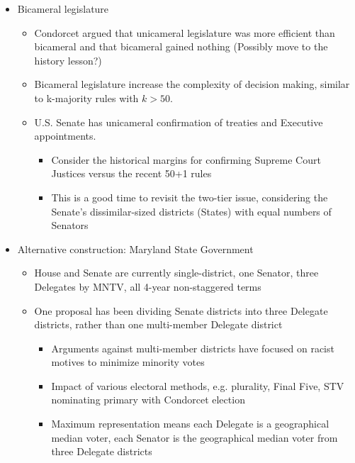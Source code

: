\begin{itemize}
    \item Bicameral legislature
    \begin{itemize}
        \item Condorcet argued that unicameral legislature was more efficient than bicameral and that bicameral gained nothing (Possibly move to the history lesson?)

        \item Bicameral legislature increase the complexity of decision making, similar to k-majority rules with $k>50$.

        \item U.S. Senate has unicameral confirmation of treaties and Executive appointments.
        \begin{itemize}
            \item Consider the historical margins for confirming Supreme Court Justices versus the recent 50+1 rules

            \item This is a good time to revisit the two-tier issue, considering the Senate's dissimilar-sized districts (States) with equal numbers of Senators
        \end{itemize}
    \end{itemize}

    \item Alternative construction:  Maryland State Government
    \begin{itemize}
        \item House and Senate are currently single-district, one Senator, three Delegates by MNTV, all 4-year non-staggered terms

        \item One proposal has been dividing Senate districts into three Delegate districts, rather than one multi-member Delegate district
        \begin{itemize}
            \item Arguments against multi-member districts have focused on racist motives to minimize minority votes

            \item Impact of various electoral methods, e.g. plurality, Final Five, STV nominating primary with Condorcet election

            \item Maximum representation means each Delegate is a geographical median voter, each Senator is the geographical median voter from three Delegate districts
        \end{itemize}


\end{itemize}
\end{itemize}
